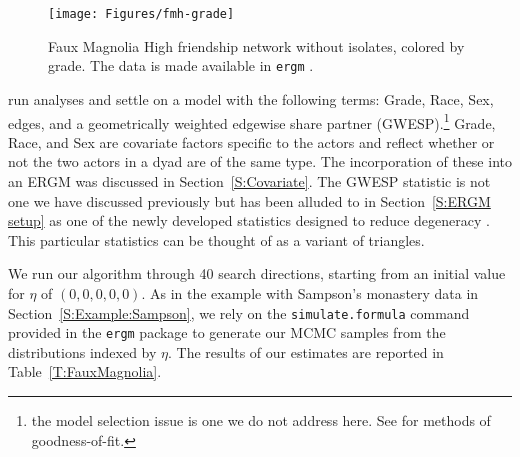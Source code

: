 \begin{figure}[!ht]
\centering
\texttt{[image: Figures/fmh-grade]}
\caption[Faux Magnolia High friendship network without isolates, colored by grade]
{Faux Magnolia High friendship network without isolates, colored by grade.  The data is made available in \texttt{ergm} \citep{ergm:R}.}
\label{F:fmh}
\end{figure}

\citet{statnet-tutorial} run analyses and settle on a model with the following terms: 
Grade, Race, Sex, edges, and a geometrically weighted edgewise share partner (GWESP).\footnote{the model selection issue is one we do not address here.  See \citet{GOF}
 for methods of goodness-of-fit.}  
Grade, Race, and Sex are covariate factors specific to the 
actors and reflect whether or not the two actors in a dyad are of the same type.  
The incorporation of these into an ERGM was 
discussed in Section~\ref{S:Covariate}.  The GWESP statistic is not one we
have discussed previously but has been alluded to in Section~\ref{S:ERGM setup} as
one of the newly developed statistics designed to reduce degeneracy 
\citep{Handcock:2006, Hunter:2006, recentp*}.  This particular statistics can be 
thought of as a variant of triangles.

We run our algorithm through 40 search directions, starting from an initial value for 
$\eta$ of $(0, 0, 0, 0, 0)$.  As in the example with Sampson's monastery data
in Section~\ref{S:Example:Sampson}, we rely
on the \texttt{simulate.formula} command provided in the \texttt{ergm} package to
generate our MCMC samples from the distributions indexed by $\eta$.  The results of our 
estimates are reported in Table~\ref{T:FauxMagnolia}.
%
%
%

